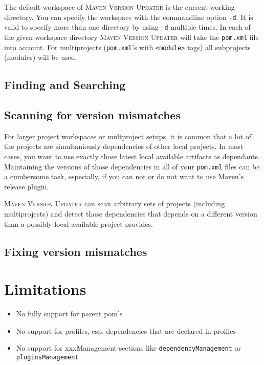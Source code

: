 \documentclass[a4paper,11pt,english,oneside,halfparskip]{scrartcl}
\newcommand{\MVU}{\textsc{\small{}Maven Version Updater}}
\newcommand{\code}[1]{\texttt{#1}}
\newcommand{\pom}{\code{pom.xml}}
\begin{document}
The default workspace of \MVU{} is the current working directory. You can specify the workspace with the commandline option \code{-d}. It is valid to specify more than one directory by using \code{-d} multiple times. In each of the given workspace directory \MVU{} will take the \pom{} file into account. For multiprojects (\pom's with \code{<module>} tags) all subprojects (modules) will be used.

\subsection{Finding and Searching}


\subsection{Scanning for version mismatches}

For larger project workspaces or multproject setups, it is common that a lot of the projects are simultaniously dependencies of other local projects. In most cases, you want to use exactly those latest local available artifacts as dependants. Maintaining the versions of those dependencies in all of your \pom{} files can be a cumbersome task, especially, if you can not or do not want to use Maven's release plugin.

\MVU{} can scan arbitrary sets of projects (including multiprojects) and detect those dependencies that depends on a different version than a possibly local available project provides.



\subsection{Fixing version mismatches}

\section{Limitations}

\begin{itemize}
 \item No fully support for parent pom's
 \item No support for profiles, esp. dependencies that are declared in profiles
 \item No support for xxxManagement-sections like \code{dependencyManagement} or \code{pluginsManagement}
\end{itemize}
\end{document}
